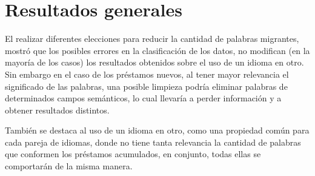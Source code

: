 \section{Resultados generales}

El realizar diferentes elecciones para reducir la cantidad de palabras migrantes, mostró que los posibles errores en la clasificación de los datos, no modifican (en la mayoría de los casos) los resultados obtenidos sobre el uso de un idioma en otro. Sin embargo en el caso de los préstamos nuevos, al tener mayor relevancia el significado de las palabras, una posible limpieza podría eliminar palabras de determinados campos semánticos, lo cual llevaría a perder información y a obtener resultados distintos. 

También se destaca al uso de un idioma en otro, como una propiedad común para cada pareja de idiomas, donde no tiene tanta relevancia la cantidad de palabras que conformen los préstamos acumulados,  en conjunto, todas ellas se comportarán de la misma manera. 






